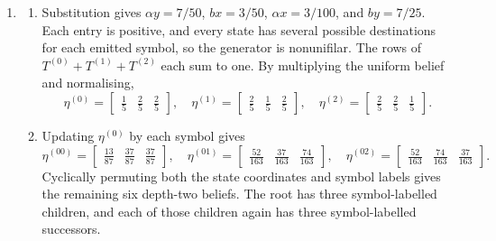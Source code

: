 \begin{solution}[ex:p3-3]
\begin{enumerate}
\begin{enumerate}
          \item The automaton begins
            \[
              \eta^{(1)}\xrightarrow{\,0\,}\eta^{(10)}
              \xrightarrow{\,0\,}\eta^{(100)}
              \xrightarrow{\,0\,}\eta^{(1000)}
              \xrightarrow{\,0\,}\cdots,
            \]
            and every $\eta^{(10^n)}$ with $n\geq1$ has a $1$-transition
            back to $\eta^{(1)}$. Since the first coordinate
            $1/(n+1)$ is different for each $n$, the beliefs are distinct, and
            \[
              \lim_{n\to\infty}\eta^{(10^n)}
                =\begin{bmatrix}0&1\end{bmatrix}.
            \]
            This limiting belief is not reached after any finite history.
            Hence the two hidden generator states induce countably infinitely
            many reachable beliefs.
        \end{enumerate}

      \item
        \begin{enumerate}
          \item Substitution gives
            $\alpha y=7/50$, $bx=3/50$, $\alpha x=3/100$, and
            $by=7/25$. Each entry is positive, and every state has several
            possible destinations for each emitted symbol, so the generator
            is nonunifilar. The rows of $T^{(0)}+T^{(1)}+T^{(2)}$ each sum to
            one. By multiplying the uniform belief and normalising,
            \[
              \eta^{(0)}=\begin{bmatrix}\tfrac15&\tfrac25&\tfrac25\end{bmatrix},
              \quad
              \eta^{(1)}=\begin{bmatrix}\tfrac25&\tfrac15&\tfrac25\end{bmatrix},
              \quad
              \eta^{(2)}=\begin{bmatrix}\tfrac25&\tfrac25&\tfrac15\end{bmatrix}.
            \]

          \item Updating $\eta^{(0)}$ by each symbol gives
            \[
              \eta^{(00)}=
                \begin{bmatrix}\tfrac{13}{87}&\tfrac{37}{87}&\tfrac{37}{87}\end{bmatrix},
              \quad
              \eta^{(01)}=
                \begin{bmatrix}\tfrac{52}{163}&\tfrac{37}{163}&\tfrac{74}{163}\end{bmatrix},
              \quad
              \eta^{(02)}=
                \begin{bmatrix}\tfrac{52}{163}&\tfrac{74}{163}&\tfrac{37}{163}\end{bmatrix}.
            \]
            Cyclically permuting both the state coordinates and symbol labels
            gives the remaining six depth-two beliefs. The root has three
            symbol-labelled children, and each of those children again has
            three symbol-labelled successors.


\end{enumerate}
\end{enumerate}
\end{solution}
